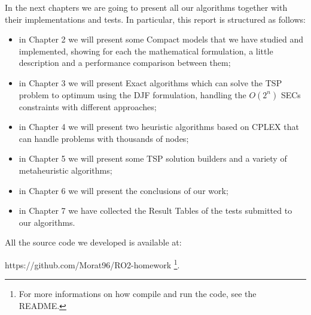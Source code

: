 \noindent 
In the next chapters we are going to present all our algorithms together with their implementations and tests. In particular, this report is structured as follows:

\begin{itemize}
  \item in Chapter 2 we will present some Compact models that we have studied and implemented, showing for each the mathematical formulation, a little description and a performance comparison between them;
  \item in Chapter 3 we will present Exact algorithms which can solve the TSP problem to optimum using the DJF formulation, handling the $O(2^n)$ SECs constraints with different approaches;
    \item in Chapter 4 we will present two heuristic algorithms based on CPLEX that can handle problems with thousands of nodes;
    \item in Chapter 5 we will present some TSP solution builders and a variety of metaheuristic algorithms;
     \item in Chapter 6 we will present the conclusions of our work;
     \item in Chapter 7 we have collected the Result Tables of the tests submitted to our algorithms.
\end{itemize}

All the source code we developed is available at:
\begin{center}
https://github.com/Morat96/RO2-homework \footnote{For more informations on how compile and run the code, see the README.}. 

\end{center}

